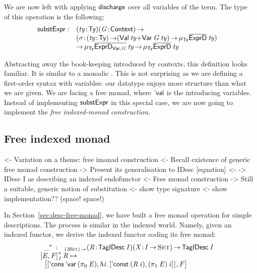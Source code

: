 \newcommand{\substH}{\F{substExpr}}

We are now left with applying $\discharge$ over all variables of the
term. The type of this operation is the following:
%
\[
\begin{array}{@{}ll}
\substH  : & \PITEL{\V{ty}}{\Ty}
             \PI{\V{G}}{\Ctxt} \\
           & \PITEL{\V{\sigma}}{\PI{\V{ty}}{\Ty}
                                (\SUM{\Val{\V{ty}}}{\Var{\V{G}}{\V{ty}}}) \To
                                \IMu{\Ty}{\toIDesc{\HExprD}}{\V{ty}}} \\
          & \To \IMu{\Ty}{\toIDesc{\HExprVarD{\V{G}}}}{\V{ty}} \To 
            \IMu{\Ty}{\toIDesc{\HExprD}}{\V{ty}}
\end{array}
\]

Abstracting away the book-keeping introduced by contexts, this
definition looks familiar. It is similar to a monadic \bind. This is
not surprising as we are defining a first-order syntax with variables:
our datatype enjoys more structure than what we are given. We are
facing a free monad, where $\SYMBEval$ is the \return introducing
variables. Instead of implementing $\substH$ in this special case, we
are now going to implement the \emph{free indexed-monad construction}.

\subsection{Free indexed monad}

\begin{wstructure}
<- Variation on a theme: free imonad construction
    <- Recall existence of generic free monad construction
    -> Present its generalisation to IDesc [equation]
        <- \I -> IDesc I as describing an indexed endofunctor
        <- Free monad construction
    -> Still a suitable, generic notion of substitution
        <- show type signature
        <- show implementation?? (space! space!)
\end{wstructure}

In Section~\ref{sec:desc-free-monad}, we have built a free monad
operation for simple descriptions. The process is similar in the
indexed world. Namely, given an indexed functor, we derive the indexed
functor coding its free monad: 
%
\[\stk{
\begin{array}{ll}
\FreeIMonad{\_}{} : & _{\PI{\V{I}}{\Set}}
                     \PITEL{\V{R}}{\TagIDesc{\V{I}}} 
                     \PITEL{\V{X}}{\V{I} \To \Set}\To 
                      \TagIDesc{\V{I}}
\end{array} \\
\FreeIMonad{\pair{\V{E}}{\V{F}}{}}{\V{I}}{\V{R}} \mapsto \\ \;\;
    \pair{\pair{\ListCons{\SYMBDVar}{(\fst{\V{E}})}} 
               {\LAM{\V{i}}
                \pair{\DConst{(\V{R}\: \V{i})}}
                     {(\snd{\V{E}})\: \V{i}}{}}{}}
         {\V{F}}{}
}\]


